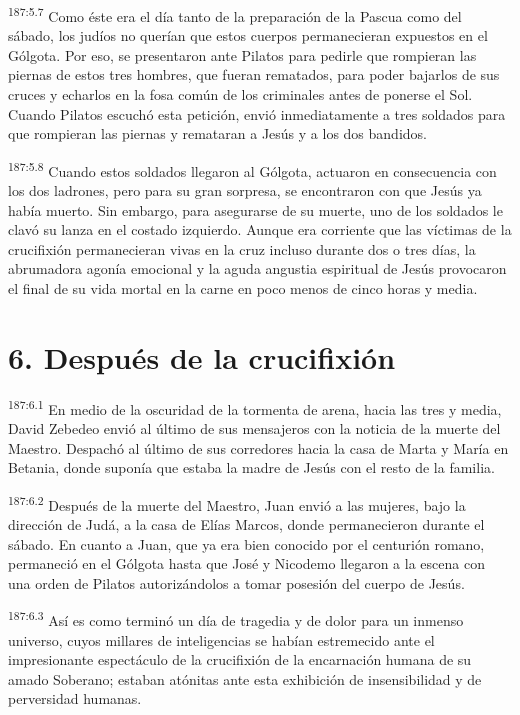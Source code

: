 \par 
\textsuperscript{187:5.7} Como éste era el día tanto de la preparación de la Pascua como del sábado, los judíos no querían que estos cuerpos permanecieran expuestos en el Gólgota. Por eso, se presentaron ante Pilatos para pedirle que rompieran las piernas de estos tres hombres, que fueran rematados, para poder bajarlos de sus cruces y echarlos en la fosa común de los criminales antes de ponerse el Sol. Cuando Pilatos escuchó esta petición, envió inmediatamente a tres soldados para que rompieran las piernas y remataran a Jesús y a los dos bandidos.

\par 
\textsuperscript{187:5.8} Cuando estos soldados llegaron al Gólgota, actuaron en consecuencia con los dos ladrones, pero para su gran sorpresa, se encontraron con que Jesús ya había muerto. Sin embargo, para asegurarse de su muerte, uno de los soldados le clavó su lanza en el costado izquierdo. Aunque era corriente que las víctimas de la crucifixión permanecieran vivas en la cruz incluso durante dos o tres días, la abrumadora agonía emocional y la aguda angustia espiritual de Jesús provocaron el final de su vida mortal en la carne en poco menos de cinco horas y media.

\section*{6. Después de la crucifixión}
\par 
\textsuperscript{187:6.1} En medio de la oscuridad de la tormenta de arena, hacia las tres y media, David Zebedeo envió al último de sus mensajeros con la noticia de la muerte del Maestro. Despachó al último de sus corredores hacia la casa de Marta y María en Betania, donde suponía que estaba la madre de Jesús con el resto de la familia.

\par 
\textsuperscript{187:6.2} Después de la muerte del Maestro, Juan envió a las mujeres, bajo la dirección de Judá, a la casa de Elías Marcos, donde permanecieron durante el sábado. En cuanto a Juan, que ya era bien conocido por el centurión romano, permaneció en el Gólgota hasta que José y Nicodemo llegaron a la escena con una orden de Pilatos autorizándolos a tomar posesión del cuerpo de Jesús.

\par 
\textsuperscript{187:6.3} Así es como terminó un día de tragedia y de dolor para un inmenso universo, cuyos millares de inteligencias se habían estremecido ante el impresionante espectáculo de la crucifixión de la encarnación humana de su amado Soberano; estaban atónitas ante esta exhibición de insensibilidad y de perversidad humanas.